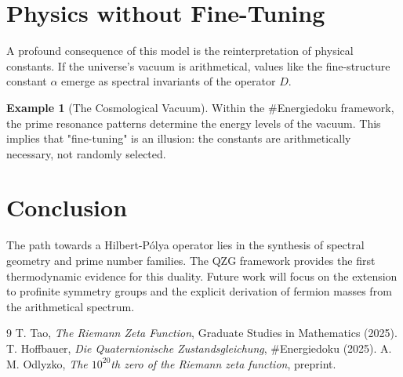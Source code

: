 \documentclass[11pt,a4paper,reqno]{article}
\theoremstyle{plain}
\theoremstyle{definition}
\newtheorem{example}[theorem]{Example}
\theoremstyle{remark}
\begin{document}
\section{Physics without Fine-Tuning}

A profound consequence of this model is the reinterpretation of physical constants. If the universe's vacuum is arithmetical, values like the fine-structure constant $\alpha$ emerge as spectral invariants of the operator $D$.

\begin{example}[The Cosmological Vacuum]
Within the \#Energiedoku framework, the prime resonance patterns determine the energy levels of the vacuum. This implies that "fine-tuning" is an illusion: the constants are arithmetically necessary, not randomly selected.
\end{example}

\section{Conclusion}

The path towards a Hilbert-P{\'o}lya operator lies in the synthesis of spectral geometry and prime number families. The QZG framework provides the first thermodynamic evidence for this duality. Future work will focus on the extension to profinite symmetry groups and the explicit derivation of fermion masses from the arithmetical spectrum.


\begin{thebibliography}{9}
 T. Tao, \textit{The Riemann Zeta Function}, Graduate Studies in Mathematics (2025).
 T. Hoffbauer, \textit{Die Quaternionische Zustandsgleichung}, \#Energiedoku (2025).
 A. M. Odlyzko, \textit{The $10^{20}$th zero of the Riemann zeta function}, preprint.
\end{thebibliography}
\end{document}
